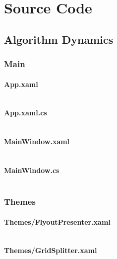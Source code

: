 \documentclass[a4paper]{report}
\begin{document}
\chapter{Source Code}

\section{Algorithm Dynamics}

\subsection{Main}

\subsubsection{App.xaml}

\inputminted{xml}{"../src/Algorithm Dynamics/App.xaml"}

\subsubsection{App.xaml.cs}

\inputminted{csharp}{"../src/Algorithm Dynamics/App.xaml.cs"}

\subsubsection{MainWindow.xaml}

\inputminted{xml}{"../src/Algorithm Dynamics/MainWindow.xaml"}

\subsubsection{MainWindow.cs}

\inputminted{csharp}{"../src/Algorithm Dynamics/MainWindow.xaml.cs"}

\subsection{Themes}

\subsubsection{Themes/FlyoutPresenter.xaml}

\inputminted{xml}{"../src/Algorithm Dynamics/Themes/FlyoutPresenter.xaml"}

\subsubsection{Themes/GridSplitter.xaml}
\end{document}
